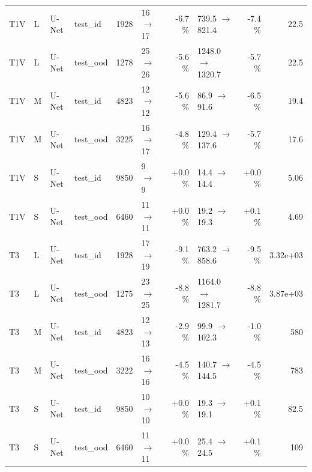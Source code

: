 \begin{table}[tb]
\begin{tabular}{llllrlrlrr}
T1V & L & U-Net & test\_id & 1928 & 16 $\rightarrow$ 17 & -6.7 \% & 739.5 $\rightarrow$ 821.4 & -7.4 \% & 22.5 \\
T1V & L & U-Net & test\_ood & 1278 & 25 $\rightarrow$ 26 & -5.6 \% & 1248.0 $\rightarrow$ 1320.7 & -5.7 \% & 22.5 \\
T1V & M & U-Net & test\_id & 4823 & 12 $\rightarrow$ 12 & -5.6 \% & 86.9 $\rightarrow$ 91.6 & -6.5 \% & 19.4 \\
T1V & M & U-Net & test\_ood & 3225 & 16 $\rightarrow$ 17 & -4.8 \% & 129.4 $\rightarrow$ 137.6 & -5.7 \% & 17.6 \\
T1V & S & U-Net & test\_id & 9850 & 9 $\rightarrow$ 9 & +0.0 \% & 14.4 $\rightarrow$ 14.4 & +0.0 \% & 5.06 \\
T1V & S & U-Net & test\_ood & 6460 & 11 $\rightarrow$ 11 & +0.0 \% & 19.2 $\rightarrow$ 19.3 & +0.1 \% & 4.69 \\
T3 & L & U-Net & test\_id & 1928 & 17 $\rightarrow$ 19 & -9.1 \% & 763.2 $\rightarrow$ 858.6 & -9.5 \% & 3.32e+03 \\
T3 & L & U-Net & test\_ood & 1275 & 23 $\rightarrow$ 25 & -8.8 \% & 1164.0 $\rightarrow$ 1281.7 & -8.8 \% & 3.87e+03 \\
T3 & M & U-Net & test\_id & 4823 & 12 $\rightarrow$ 13 & -2.9 \% & 99.9 $\rightarrow$ 102.3 & -1.0 \% & 580 \\
T3 & M & U-Net & test\_ood & 3222 & 16 $\rightarrow$ 16 & -4.5 \% & 140.7 $\rightarrow$ 144.5 & -4.5 \% & 783 \\
T3 & S & U-Net & test\_id & 9850 & 10 $\rightarrow$ 10 & +0.0 \% & 19.3 $\rightarrow$ 19.1 & +0.1 \% & 82.5 \\
T3 & S & U-Net & test\_ood & 6460 & 11 $\rightarrow$ 11 & +0.0 \% & 25.4 $\rightarrow$ 24.5 & +0.1 \% & 109 \\
\bottomrule
\end{tabular}
\end{table}
